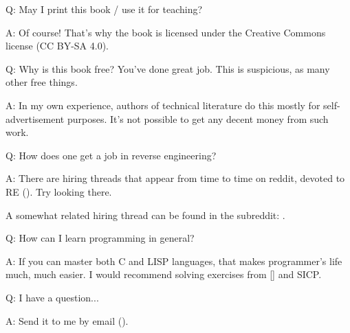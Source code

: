 \par Q: May I print this book / use it for teaching?
\par A: Of course! That's why the book is licensed under the Creative Commons license (CC BY-SA 4.0).

\par Q: Why is this book free? You've done great job. This is suspicious, as many other free things.
\par A: In my own experience, authors of technical literature do this mostly for self-advertisement purposes. It's not possible to get any decent money from such work.

\par Q: How does one get a job in reverse engineering?
\par A: There are hiring threads that appear from time to time on reddit, devoted to RE\FNURLREDDIT{}
(\RedditHiringThread{}).
Try looking there.

A somewhat related hiring thread can be found in the  subreddit: \NetsecHiringThread{}.

\par Q: How can I learn programming in general?
\par A: If you can master both C and LISP languages, that makes programmer's life much, much easier.
I would recommend solving exercises from [\KRBook] and \ac{SICP}.

\par Q: I have a question...
\par A: Send it to me by email (\EMAIL).

